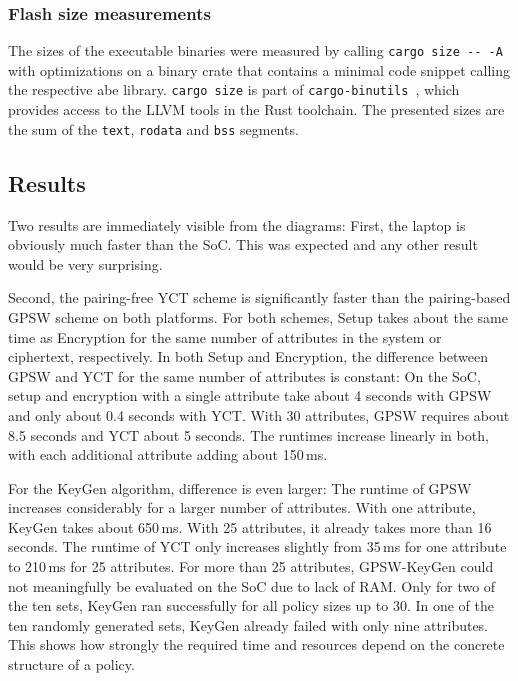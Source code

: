 \subsubsection{Flash size measurements}


The sizes of the executable binaries were measured by calling \verb+cargo size -- -A+ with optimizations on a binary crate that contains a minimal code snippet calling the respective \acrshort{abe} library.
\verb+cargo size+ is part of \verb+cargo-binutils+~\cite{noauthor_cargo-binutils_nodate}, which provides access to the LLVM tools in the Rust toolchain.
The presented sizes are the sum of the \texttt{text}, \texttt{rodata} and \texttt{bss} segments.


\subsection{Results}
Two results are immediately visible from the diagrams:
First, the laptop is obviously much faster than the SoC.
This was expected and any other result would be very surprising.

Second, the pairing-free YCT scheme is significantly faster than the pairing-based GPSW scheme on both platforms. 
For both schemes, Setup takes about the same time as Encryption for the same number of attributes in the system or ciphertext, respectively.
In both Setup and Encryption, the difference between GPSW and YCT for the same number of attributes is constant:
On the SoC, setup and encryption with a single attribute take about 4 seconds with GPSW and only about 0.4 seconds with YCT.
With 30 attributes, GPSW requires about 8.5 seconds and YCT about 5 seconds.
The runtimes increase linearly in both, with each additional attribute adding about 150\,ms.

For the KeyGen algorithm, difference is even larger:
The runtime of GPSW increases considerably for a larger number of attributes.
With one attribute, KeyGen takes about 650\,ms. With 25 attributes, it already takes more than 16 seconds.
The runtime of YCT only increases slightly from 35\,ms for one attribute to 210\,ms for 25 attributes.
For more than 25 attributes, GPSW-KeyGen could not meaningfully be evaluated on the SoC due to lack of RAM.
Only for two of the ten sets, KeyGen ran successfully for all policy sizes up to 30.
In one of the ten randomly generated sets, KeyGen already failed with only nine attributes.
This shows how strongly the required time and resources depend on the concrete structure of a policy.

